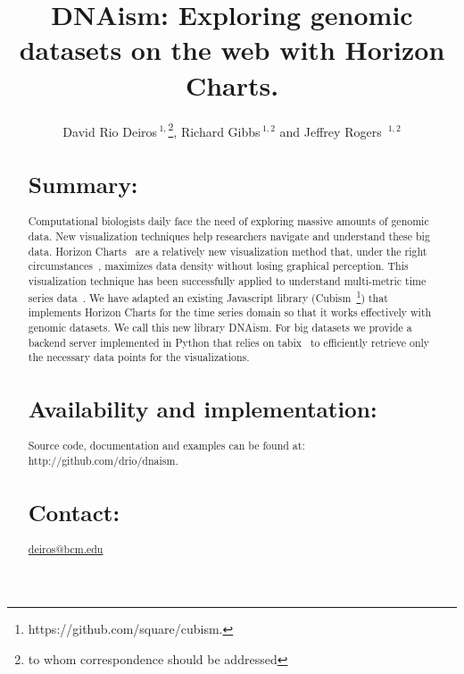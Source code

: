 \documentclass{bioinfo}
\begin{document}

\title[short Title]{DNAism: Exploring genomic datasets on the web with Horizon Charts. }

\author[Sample \textit{et~al}]{David Rio Deiros\,$^{1,}$\footnote{to whom correspondence should be addressed},
Richard Gibbs\,$^{1,2}$ and Jeffrey Rogers\, $^{1,2}$}

\address{$^{1}$Human Genome Sequencing Center, Baylor College of Medicine, Houston, TX.\\
$^{2}$Department of Molecular and Human Genetics, Baylor College of Medicine, Houston, TX.}



\maketitle

\begin{abstract}

\section{Summary:}

Computational biologists daily face the need of exploring massive amounts of
genomic data. New visualization techniques help researchers navigate and
understand these big data. Horizon Charts~\citep{time-in-the-horizon} are a
relatively new visualization method that, under the right
circumstances~\citep{2009-horizon}, maximizes data density without losing
graphical perception. This visualization technique has been successfully
applied to understand multi-metric time series
data~\citep{time-in-the-horizon}. We have adapted an existing Javascript
library (Cubism~\footnote{https://github.com/square/cubism.}) that implements
Horizon Charts for the time series domain so that it works effectively with
genomic datasets. We call this new library DNAism. For big datasets we provide
a backend server implemented in Python that relies on tabix~\citep{tabix-li} to
efficiently retrieve only the necessary data points for the visualizations.

\section{Availability and implementation:}
Source code, documentation and examples can be found at:
http://github.com/drio/dnaism.

\section{Contact:} \href{deiros@bcm.edu}{deiros@bcm.edu}
\end{abstract}
\end{document}
